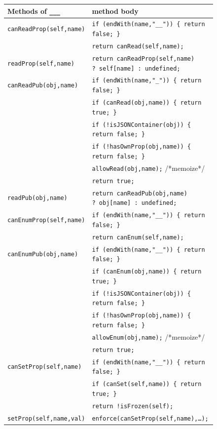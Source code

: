 \documentclass[letterpaper,twocolumn,10pt]{article}
\newcommand{\code}[1]{{\tt {#1}}}              %
\begin{document}
\begin{figure}
\begin{tabular}{ll}
  Methods of \code{\_\_\_}  & method body \\ 
  \hline 
  \code{canReadProp(self,name)}
       & \code{if (endWith(name,"\_\_"))\ \{ return false; \}} \\
       & \code{return canRead(self,name);} \\
  \code{readProp(self,name)}
       & \code{return canReadProp(self,name) ?\ self[name] :\ undefined;} \\
  \code{canReadPub(obj,name)}
       & \code{if (endWith(name,"\_"))\ \{ return false; \}} \\
       & \code{if (canRead(obj,name))\ \{ return true; \}} \\
       & \code{if (!isJSONContainer(obj))\ \{ return false; \}} \\
       & \code{if (!hasOwnProp(obj,name))\ \{ return false; \}} \\
       & \code{allowRead(obj,name);} /*memoize*/ \\
       & \code{return true;} \\
  \code{readPub(obj,name)}
       & \code{return canReadPub(obj,name) ?\ obj[name] :\ undefined;} \\
  \hline
  \code{canEnumProp(self,name)} 
       & \code{if (endWith(name,"\_\_"))\ \{ return false; \}} \\
       & \code{return canEnum(self,name);} \\
  \code{canEnumPub(obj,name)}
       & \code{if (endWith(name,"\_\_"))\ \{ return false; \}} \\
       & \code{if (canEnum(obj,name))\ \{ return true; \}} \\
       & \code{if (!isJSONContainer(obj))\ \{ return false; \}} \\
       & \code{if (!hasOwnProp(obj,name))\ \{ return false; \}} \\
       & \code{allowEnum(obj,name);} /*memoize*/ \\
       & \code{return true;} \\
  \hline
  \code{canSetProp(self,name)}
       & \code{if (endWith(name,"\_\_"))\ \{ return false; \}} \\
       & \code{if (canSet(self,name))\ \{ return true; \}} \\
       & \code{return !isFrozen(self);} \\
  \code{setProp(self,name,val)}
       & \code{enforce(canSetProp(self,name),\ldots);} \\

\end{tabular}
\end{figure}
\end{document}
